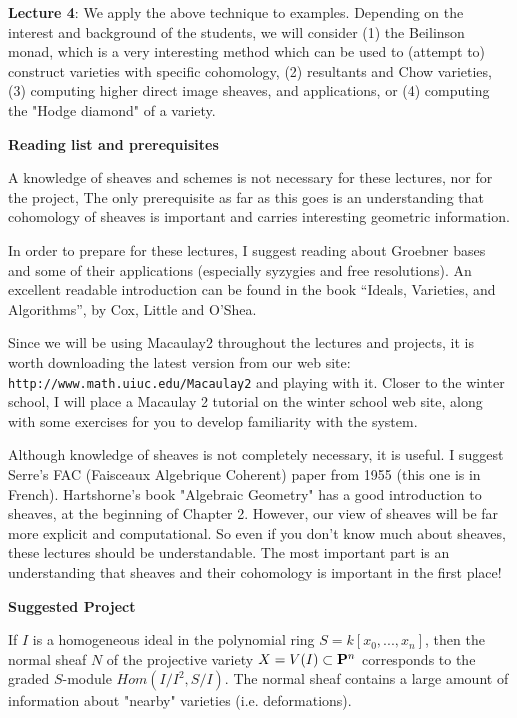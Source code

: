 \bigskip\noindent
{\bf Lecture 4}: We apply the above technique to examples.  Depending on the
interest and background of the students, we will consider (1)
the Beilinson monad, which is a very interesting method which can be
used to (attempt to) construct varieties with specific cohomology, (2)
resultants and Chow varieties, (3) computing higher direct image
sheaves, and applications, or (4) computing the "Hodge diamond" of a variety.

\bigskip\noindent
{\bf Reading list and prerequisites}

\medskip%
A knowledge of sheaves and schemes is not necessary for these lectures, nor
for the project,  The only prerequisite as far as this goes is an understanding that 
cohomology of sheaves is important and carries interesting geometric information.

\smallskip%
In order to prepare for these lectures, I suggest reading about Groebner 
bases and some of their applications (especially syzygies and free resolutions).  
An excellent readable introduction can be found in the book  
``Ideals, Varieties, and Algorithms'', by Cox, Little and O'Shea.

\smallskip%
Since we will be using Macaulay2 throughout the lectures and 
projects, it is worth downloading the latest version from 
our web site: {\tt http://www.math.uiuc.edu/Macaulay2} and playing with it.
Closer to the winter school, I will place a Macaulay 2 tutorial 
on the winter school web site, along with some exercises for you to develop
familiarity with the system.

\smallskip%
Although knowledge of sheaves is not completely necessary, it is
useful.  I suggest Serre's FAC (Faisceaux Algebrique Coherent) paper
from 1955 (this one is in French).  Hartshorne's book "Algebraic
Geometry" has a good introduction to sheaves, at the beginning of
Chapter 2.  However, our view of sheaves will be far more explicit and
computational.  So even if you don't know much about sheaves, these
lectures should be understandable.  The most important part is an
understanding that sheaves and their cohomology is important in the
first place!

\bigskip\noindent
{\bf Suggested Project} 

\medskip
 If $I$ is a homogeneous ideal in the polynomial ring $S =
k[x_0,...,x_n]$, then the normal sheaf $N$ of the projective variety
$X = V(I) \subset {\bf P}^n$ corresponds to the graded $S$-module
$Hom(I/I^2,S/I)$.  The normal sheaf contains a large amount of
information about "nearby" varieties (i.e. deformations).

